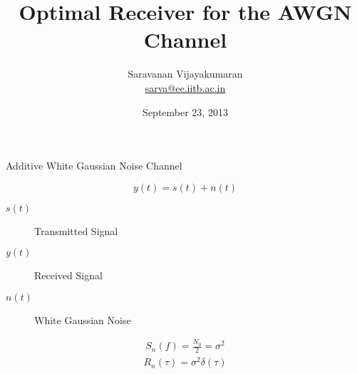 \documentclass[t]{beamer}
\title[EE 703 DMT]{Optimal Receiver for the AWGN Channel}
\author[Saravanan V]
{
  Saravanan Vijayakumaran\\
  \href{mailto:sarva@ee.iitb.ac.in}{sarva@ee.iitb.ac.in}
}
\institute[IIT Bombay]
{
  Department of Electrical Engineering\\
  Indian Institute of Technology Bombay
}
\date{September 23, 2013}
\begin{document}
\begin{frame}
  \titlepage
\end{frame}

\begin{frame}{Additive White Gaussian Noise Channel}
  \footnotesize
  \begin{figure}
    \centering
  \end{figure}
  \pause
  \begin{equation*}
    y(t) = s(t) + n(t)
  \end{equation*}
  \pause
  \begin{description}
    \item[$s(t)$] Transmitted Signal
    \pause
    \item[$y(t)$] Received Signal
    \pause
    \item[$n(t)$] White Gaussian Noise
  \end{description}
  \pause
  \begin{eqnarray*}
    S_n(f) = \frac{N_0}{2} = \sigma^2 
  \end{eqnarray*}
  \pause
  \begin{eqnarray*}
    R_n(\tau) = \sigma^2 \delta(\tau)
  \end{eqnarray*}
  \normalsize
\end{frame}
\end{document}

